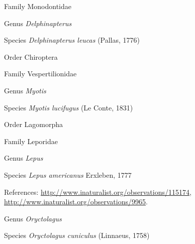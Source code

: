 \documentclass[9pt, article]{memoir}
\begin{document}
\begin{multicols}{2}
\vspace{6pt}\noindent\hspace{24pt}Family Monodontidae


\vspace{6pt}\noindent\hspace{30pt}Genus \textit{Delphinapterus}


\vspace{6pt}\noindent\hspace{36pt}Species \textit{Delphinapterus leucas} (Pallas, 1776)


\vspace{6pt}\noindent\hspace{18pt}Order Chiroptera


\vspace{6pt}\noindent\hspace{24pt}Family Vespertilionidae


\vspace{6pt}\noindent\hspace{30pt}Genus \textit{Myotis}


\vspace{6pt}\noindent\hspace{36pt}Species \textit{Myotis lucifugus} (Le Conte, 1831)


\vspace{6pt}\noindent\hspace{18pt}Order Lagomorpha


\vspace{6pt}\noindent\hspace{24pt}Family Leporidae


\vspace{6pt}\noindent\hspace{30pt}Genus \textit{Lepus}


\vspace{6pt}\noindent\hspace{36pt}Species \textit{Lepus americanus} Erxleben, 1777


\vspace{6pt}References: 
\url{http://www.inaturalist.org/observations/115174}, 
\url{http://www.inaturalist.org/observations/9965}.

\vspace{6pt}\noindent\hspace{30pt}Genus \textit{Oryctolagus}


\vspace{6pt}\noindent\hspace{36pt}Species \textit{Oryctolagus cuniculus} (Linnaeus, 1758)



\end{multicols}
\end{document}

